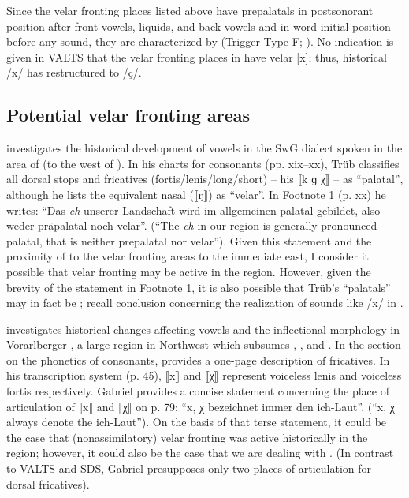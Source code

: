 Since the velar fronting places listed above have prepalatals in postsonorant position after front vowels, liquids, and back vowels and in word-initial position before any sound, they are characterized by  (Trigger Type F; ). No indication is given in VALTS that the velar fronting places in  have velar [x]; thus, historical /x/ has restructured to /ç/.

\subsection{Potential velar fronting areas}\largerpage
\citet{Trüb1951} investigates the historical development of vowels in the SwG dialect spoken in the area of  (to the west of ). In his charts for consonants (pp. xix--xx), Trüb classifies all dorsal stops and fricatives (fortis/lenis/long/short) -- his ⟦k ɡ χ⟧ -- as “palatal”, although he lists the equivalent nasal (⟦ŋ⟧) as  “velar”. In Footnote 1 (p. xx) he writes: “Das \textit{ch} unserer Landschaft wird im allgemeinen palatal gebildet, also weder präpalatal noch velar”. (“The \textit{ch} in our region is generally pronounced palatal, that is neither prepalatal nor velar”). Given this statement and the proximity of  to the velar fronting areas to the immediate east, I consider it possible that velar fronting may be active in the region. However, given the brevity of the statement in Footnote 1, it is also possible that Trüb’s “palatals” may in fact be ; recall  conclusion concerning the realization of sounds like /x/ in .

\citet{Gabriel1963} investigates historical changes affecting vowels and the inflectional morphology in Vorarlberger , a large region in Northwest  which subsumes , , and . In the section on the phonetics of consonants, \citet[79]{Gabriel1963} provides a one-page description of fricatives. In his transcription system (p. 45), ⟦x⟧ and ⟦χ⟧ represent voiceless lenis and voiceless fortis respectively. Gabriel provides a concise statement concerning the place of articulation of ⟦x⟧ and ⟦χ⟧ on p. 79: “x, χ  bezeichnet immer den ich-Laut”.   (“x, χ always denote the ich-Laut”). On the basis of that terse statement, it could be the case that (nonassimilatory) velar fronting was active historically in the region; however, it could also be the case that we are dealing with . (In contrast to VALTS and SDS, Gabriel presupposes only two places of articulation for dorsal fricatives).


